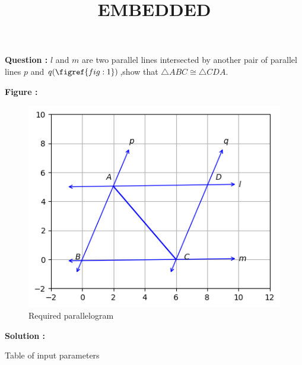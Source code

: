 \documentclass[12pt]{article}
\begin{document}
\title{\textbf{EMBEDDED}}
\date{}
\maketitle
\textbf{Question :} $l$ and $m$ are two parallel lines intersected by another pair of parallel lines $p$ and $q (\figref{fig:1})$,show that $\triangle ABC \cong \triangle CDA$.

\textbf{Figure :}
\begin{figure}[H]
    \centering
    \includegraphics{fig/em1.png}
    \caption{Required parallelogram}
    \label{fig:fig:1}
\end{figure}

\textbf{Solution :}
\begin{table}[H]
    \centering
    
    \caption{Table of input parameters}
    \label{tab:tab:1}
\end{table}
\end{document}
